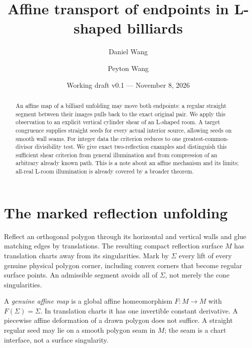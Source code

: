 \documentclass[11pt]{article}
\title{Affine transport of endpoints in L-shaped billiards}
\author{Daniel Wang \and Peyton Wang}
\date{Working draft v0.1 --- November 8, 2026}
\theoremstyle{definition}
\begin{document}
\maketitle
\begin{abstract}
An affine map of a billiard unfolding may move both endpoints: a regular straight segment between their images pulls back to the exact original pair. We apply this observation to an explicit vertical cylinder shear of an L-shaped room. A target congruence supplies straight seeds for every actual interior source, allowing seeds on smooth wall seams. For integer data the criterion reduces to one greatest-common-divisor divisibility test. We give exact two-reflection examples and distinguish this sufficient shear criterion from general illumination and from compression of an arbitrary already known path. This is a note about an affine mechanism and its limits; all-real L-room illumination is already covered by a broader theorem.
\end{abstract}

\section{The marked reflection unfolding}
Reflect an orthogonal polygon through its horizontal and vertical walls and glue matching edges by translations. The resulting compact reflection surface $M$ has translation charts away from its singularities. Mark by $\Sigma$ every lift of every genuine physical polygon corner, including convex corners that become regular surface points. An admissible segment avoids all of $\Sigma$, not merely the cone singularities.

A \emph{genuine affine map} is a global affine homeomorphism $F:M\to M$ with $F(\Sigma)=\Sigma$. In translation charts it has one invertible constant derivative. A piecewise affine deformation of a drawn polygon does not suffice. A straight regular seed may lie on a smooth polygon seam in $M$; the seam is a chart interface, not a surface singularity.
\end{document}
